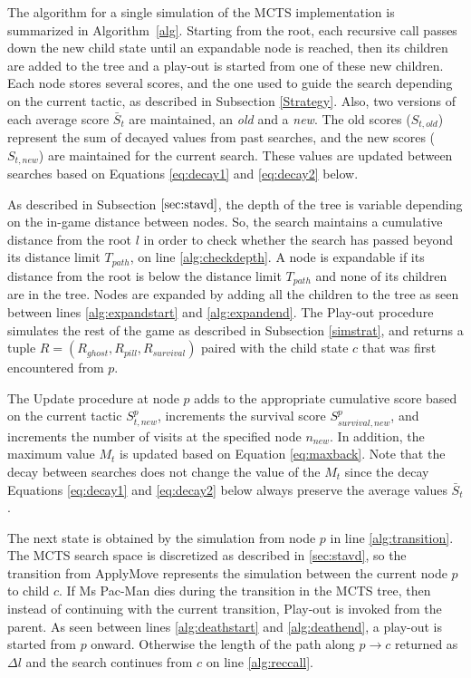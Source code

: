 \documentclass[journal]{IEEEtran}
\begin{document}
The algorithm for a single simulation of the MCTS implementation is summarized in Algorithm~\ref{alg}. Starting from the root, each recursive call passes down the new child state until an expandable node is reached, then its children are added to the tree and a play-out is started from one of these new children. Each node stores several scores, and the one used to guide the search depending on the current tactic, as described in Subsection \ref{Strategy}. Also, two versions of each average score $\bar{S}_t$ are maintained, an \emph{old} and a \emph{new}. The old scores ($S_{t,old}$) represent the sum of decayed values from past searches, and the new scores ($S_{t,new}$) are maintained for the current search. These values are updated between searches based on Equations \ref{eq:decay1} and \ref{eq:decay2} below. %

As described in Subsection $\ref{sec:stavd}$, the depth of the tree is variable depending on the in-game distance between nodes. So, the search maintains a cumulative distance from the root $l$ in order to check whether the search has passed beyond its distance limit $T_{path}$, on line \ref{alg:checkdepth}. A node is expandable if its distance from the root is below the distance limit $T_{path}$ and none of its children are in the tree. Nodes are expanded by adding all the children to the tree as seen between lines \ref{alg:expandstart} and \ref{alg:expandend}. The {\sc Play-out} procedure simulates the rest of the game as described in Subsection \ref{simstrat}, and returns a tuple $R = (R_{ghost}, R_{pill}, R_{survival})$ paired with the child state $c$ that was first encountered from $p$. 

The {\sc Update} procedure at node $p$ adds to the appropriate cumulative score based on the current tactic $S^p_{t,new}$, increments the survival score $S^p_{survival,new}$, and increments the number of visits at the specified node $n_{new}$. In addition, the maximum value $M_t$ is updated based on Equation \ref{eq:maxback}. Note that the decay between searches does not change the value of the $M_t$ since the decay Equations \ref{eq:decay1} and \ref{eq:decay2} below always preserve the average values $\bar{S}_t$.

The next state is obtained by the simulation from node $p$ in line \ref{alg:transition}. The MCTS search space is discretized as described in \ref{sec:stavd}, so the transition from {\sc ApplyMove} represents the simulation between the current node $p$ to child $c$. If Ms Pac-Man dies during the transition in the MCTS tree, then instead of continuing with the current transition, {\sc Play-out} is invoked from the parent. As seen between lines \ref{alg:deathstart} and \ref{alg:deathend}, a play-out is started from $p$ onward. Otherwise the length of the path along $p \rightarrow c$ returned as $\Delta l$ and the search continues from $c$ on line \ref{alg:reccall}. %
\end{document}
